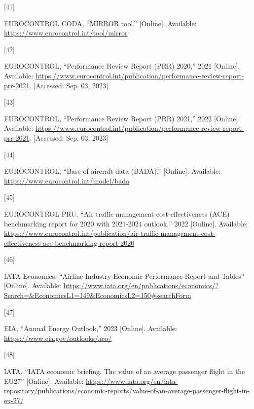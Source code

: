 \documentclass[
  11pt,
  a4paper,
]{book}
\newlength{\cslhangindent}
\newlength{\csllabelwidth}
\newlength{\cslentryspacingunit} %
\newenvironment{CSLReferences}[2] %
 {%
  \setlength{\parindent}{0pt}
  \ifodd #1
  \let\oldpar\par
  \def\par{\hangindent=\cslhangindent\oldpar}
  \fi
  \setlength{\parskip}{#2\cslentryspacingunit}
 }%
 {}
\newcommand{\CSLLeftMargin}[1]{\parbox[t]{\csllabelwidth}{#1}}
\newcommand{\CSLRightInline}[1]{\parbox[t]{\linewidth - \csllabelwidth}{#1}\break}
\begin{document}
\begin{CSLReferences}{0}{0}
\leavevmode{}%
\CSLLeftMargin{{[}41{]} }%
\CSLRightInline{EUROCONTROL CODA, {``{MIRROR} tool.''} {[}Online{]}.
Available: \url{https://www.eurocontrol.int/tool/mirror}}

\leavevmode{}%
\CSLLeftMargin{{[}42{]} }%
\CSLRightInline{EUROCONTROL, {``Performance {Review Report} ({PRR})
2020,''} 2021 {[}Online{]}. Available:
\url{https://www.eurocontrol.int/publication/performance-review-report-prr-2021}.
{[}Accessed: Sep. 03, 2023{]}}

\leavevmode{}%
\CSLLeftMargin{{[}43{]} }%
\CSLRightInline{EUROCONTROL, {``Performance {Review Report} ({PRR})
2021,''} 2022 {[}Online{]}. Available:
\url{https://www.eurocontrol.int/publication/performance-review-report-prr-2021}.
{[}Accessed: Sep. 03, 2023{]}}

\leavevmode{}%
\CSLLeftMargin{{[}44{]} }%
\CSLRightInline{EUROCONTROL, {``Base of aircraft data ({BADA}).''}
{[}Online{]}. Available: \url{https://www.eurocontrol.int/model/bada}}

\leavevmode{}%
\CSLLeftMargin{{[}45{]} }%
\CSLRightInline{EUROCONTROL PRU, {``Air traffic management
cost-effectiveness ({ACE}) benchmarking report for 2020 with 2021-2024
outlook,''} 2022 {[}Online{]}. Available:
\url{https://www.eurocontrol.int/publication/air-traffic-management-cost-effectiveness-ace-benchmarking-report-2020}}

\leavevmode{}%
\CSLLeftMargin{{[}46{]} }%
\CSLRightInline{IATA Economics, {``Airline {Industry Economic
Performance Report} and {Tables}''} {[}Online{]}. Available:
\url{https://www.iata.org/en/publications/economics/?Search=\&EconomicsL1=149\&EconomicsL2=150\#searchForm}}

\leavevmode{}%
\CSLLeftMargin{{[}47{]} }%
\CSLRightInline{EIA, {``Annual {Energy Outlook},''} 2023 {[}Online{]}.
Available: \url{https://www.eia.gov/outlooks/aeo/}}

\leavevmode{}%
\CSLLeftMargin{{[}48{]} }%
\CSLRightInline{IATA, {``{IATA} economic briefing. {The} value of an
average passenger flight in the {EU27}''} {[}Online{]}. Available:
\url{https://www.iata.org/en/iata-repository/publications/economic-reports/value-of-an-average-passenger-flight-in-eu-27/}}


\end{CSLReferences}
\end{document}
